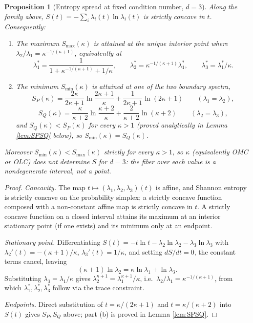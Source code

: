 \documentclass{article}
\newtheorem{proposition}[theorem]{Proposition}
\theoremstyle{remark}
\begin{document}
\begin{proposition}[Entropy spread at fixed condition number, $d=3$]\label{prop:spread}
Along the family above, $S(t)=-\sum_i\lambda_i(t)\ln\lambda_i(t)$ is strictly concave in $t$. Consequently:
\begin{enumerate}[label=(\alph*)]
\item The maximum $S_{\max}(\kappa)$ is attained at the unique interior point where $\lambda_2/\lambda_1=\kappa^{-1/(\kappa+1)}$, equivalently at
\[
\lambda_1^* = \frac1{1+\kappa^{-1/(\kappa+1)}+1/\kappa}, \qquad \lambda_2^*=\kappa^{-1/(\kappa+1)}\lambda_1^*, \qquad \lambda_3^*=\lambda_1^*/\kappa.
\]
\item The minimum $S_{\min}(\kappa)$ is attained at one of the two boundary spectra,
\[
S_P(\kappa) = \frac{2\kappa}{2\kappa+1}\ln\frac{2\kappa+1}{\kappa} + \frac1{2\kappa+1}\ln(2\kappa+1) \qquad (\lambda_1=\lambda_2),
\]
\[
S_Q(\kappa) = \frac{\kappa}{\kappa+2}\ln\frac{\kappa+2}{\kappa} + \frac2{\kappa+2}\ln(\kappa+2) \qquad (\lambda_2=\lambda_3),
\]
and $S_Q(\kappa) < S_P(\kappa)$ for every $\kappa>1$ (proved analytically in Lemma \ref{lem:SPSQ} below), so $S_{\min}(\kappa)=S_Q(\kappa)$.
\end{enumerate}
Moreover $S_{\min}(\kappa)<S_{\max}(\kappa)$ strictly for every $\kappa>1$, so $\kappa$ (equivalently OMC or OLC) does not determine $S$ for $d=3$: the fiber over each value is a nondegenerate interval, not a point.
\end{proposition}
\begin{proof}
\emph{Concavity.} The map $t\mapsto(\lambda_1,\lambda_2,\lambda_3)(t)$ is affine, and Shannon entropy is strictly concave on the probability simplex; a strictly concave function composed with a non-constant affine map is strictly concave in $t$. A strictly concave function on a closed interval attains its maximum at an interior stationary point (if one exists) and its minimum only at an endpoint.

\emph{Stationary point.} Differentiating $S(t)=-t\ln t-\lambda_2\ln\lambda_2-\lambda_3\ln\lambda_3$ with $\lambda_2'(t)=-(\kappa+1)/\kappa$, $\lambda_3'(t)=1/\kappa$, and setting $dS/dt=0$, the constant terms cancel, leaving
\[
(\kappa+1)\ln\lambda_2 = \kappa\ln\lambda_1+\ln\lambda_3.
\]
Substituting $\lambda_3=\lambda_1/\kappa$ gives $\lambda_2^{\kappa+1}=\lambda_1^{\kappa+1}/\kappa$, i.e.\ $\lambda_2/\lambda_1=\kappa^{-1/(\kappa+1)}$, from which $\lambda_1^*,\lambda_2^*,\lambda_3^*$ follow via the trace constraint.

\emph{Endpoints.} Direct substitution of $t=\kappa/(2\kappa+1)$ and $t=\kappa/(\kappa+2)$ into $S(t)$ gives $S_P,S_Q$ above; part (b) is proved in Lemma \ref{lem:SPSQ}.
\end{proof}
\end{document}
